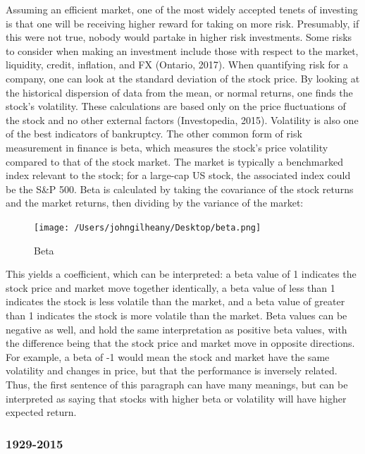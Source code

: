 \documentclass[12pt,twoside]{reedthesis}
\theoremstyle{definition}
\theoremstyle{definition}
\theoremstyle{definition}
\theoremstyle{remark}
\begin{document}
Assuming an efficient market, one of the most widely accepted tenets of
investing is that one will be receiving higher reward for taking on more
risk. Presumably, if this were not true, nobody would partake in higher
risk investments. Some risks to consider when making an investment
include those with respect to the market, liquidity, credit, inflation,
and FX (Ontario, 2017). When quantifying risk for a company, one can
look at the standard deviation of the stock price. By looking at the
historical dispersion of data from the mean, or normal returns, one
finds the stock's volatility. These calculations are based only on the
price fluctuations of the stock and no other external factors
(Investopedia, 2015). Volatility is also one of the best indicators of
bankruptcy. The other common form of risk measurement in finance is
beta, which measures the stock's price volatility compared to that of
the stock market. The market is typically a benchmarked index relevant
to the stock; for a large-cap US stock, the associated index could be
the S\&P 500. Beta is calculated by taking the covariance of the stock
returns and the market returns, then dividing by the variance of the
market:
\begin{figure}
\centerline{\texttt{[image: /Users/johngilheany/Desktop/beta.png]}}
\caption{Beta}
\label{B}
\end{figure}
This yields a coefficient, which can be interpreted: a beta value of 1
indicates the stock price and market move together identically, a beta
value of less than 1 indicates the stock is less volatile than the
market, and a beta value of greater than 1 indicates the stock is more
volatile than the market. Beta values can be negative as well, and hold
the same interpretation as positive beta values, with the difference
being that the stock price and market move in opposite directions. For
example, a beta of -1 would mean the stock and market have the same
volatility and changes in price, but that the performance is inversely
related. Thus, the first sentence of this paragraph can have many
meanings, but can be interpreted as saying that stocks with higher beta
or volatility will have higher expected return.

\subsubsection{1929-2015}\label{section}
\end{document}
